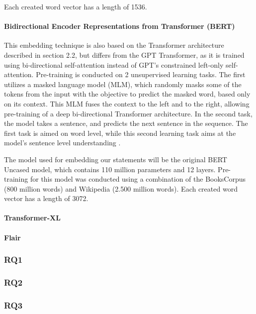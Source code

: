 Each created word vector has a length of 1536.

\paragraph{Bidirectional Encoder Representations from Transformer (BERT)}
This embedding technique is also based on the Transformer architecture described in section 2.2, but differs from the GPT Transformer, as it is trained using bi-directional self-attention instead of GPT's constrained left-only self-attention.
Pre-training is conducted on 2 unsupervised learning tasks. 
The first utilizes a masked language model (MLM), which randomly masks some of the tokens from the input with the objective to predict the masked word, based only on its context.
This MLM fuses the context to the left and to the right, allowing pre-training of a deep bi-directional Transformer architecture.
In the second task, the model takes a sentence, and predicts the next sentence in the sequence. 
The first task is aimed on word level, while this second learning task aims at the model's sentence level understanding \cite{devlin2018}. 

The model used for embedding our statements will be the original BERT Uncased model, which contains 110 million parameters and 12 layers. 
Pre-training for this model was conducted using a combination of the BooksCorpus (800 million words) and Wikipedia (2.500 million words).
Each created word vector has a length of 3072. 

\paragraph{Transformer-XL}

\paragraph{Flair}

\subsubsection{RQ1}

\subsubsection{RQ2}

\subsubsection{RQ3}
